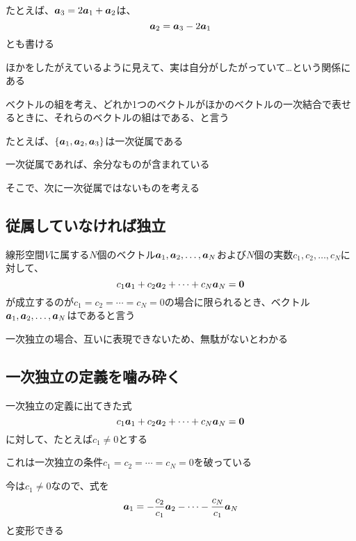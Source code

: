 \documentclass[../book_half_step_linear]{subfiles}
\begin{document}
たとえば、$\vb*{a}_3 = 2\vb*{a}_1 + \vb*{a}_2$は、
\begin{equation*}
  \vb*{a}_2 = \vb*{a}_3 - 2\vb*{a}_1
\end{equation*}
とも書ける

ほかをしたがえているように見えて、実は自分がしたがっていて…という関係にある

\br

ベクトルの組を考え、どれか1つのベクトルがほかのベクトルの一次結合で表せるときに、それらのベクトルの組はである、と言う

たとえば、$\{ \vb*{a}_1, \vb*{a}_2, \vb*{a}_3 \}$は一次従属である

\br

一次従属であれば、余分なものが含まれている

そこで、次に一次従属ではないものを考える

\sectionline
\subsection{従属していなければ独立}

線形空間$V$に属する$N$個のベクトル$\vb*{a}_1, \vb*{a}_2, \ldots, \vb*{a}_N$および$N$個の実数$c_1, c_2, \ldots, c_N$に対して、
\begin{equation*}
  c_1\vb*{a}_1 + c_2\vb*{a}_2 + \cdots + c_N\vb*{a}_N = \vb*{0}
\end{equation*}
が成立するのが$c_1 = c_2 = \cdots = c_N = 0$の場合に限られるとき、ベクトル$\vb*{a}_1, \vb*{a}_2, \ldots, \vb*{a}_N$はであると言う

\br

一次独立の場合、互いに表現できないため、無駄がないとわかる

\sectionline
\subsection{一次独立の定義を噛み砕く}

一次独立の定義に出てきた式
\begin{equation*}
  c_1\vb*{a}_1 + c_2\vb*{a}_2 + \cdots + c_N\vb*{a}_N = \vb*{0}
\end{equation*}
に対して、たとえば$c_1 \neq 0$とする

これは一次独立の条件$c_1 = c_2 = \cdots = c_N = 0$を破っている

今は$c_1 \neq 0$なので、式を
\begin{equation*}
  \vb*{a}_1 = -\frac{c_2}{c_1}\vb*{a}_2 - \cdots - \frac{c_N}{c_1}\vb*{a}_N
\end{equation*}
と変形できる
\end{document}
